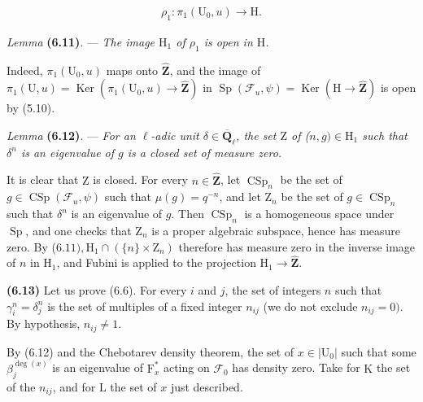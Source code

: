 \documentclass[10pt,leqno]{article}
\begin{document}
\begin{equation*}\begin{gathered}\rho _{1} : \pi _{1}(\mathrm{U}_{0},u) \longrightarrow  \mathrm{H}.\end{gathered}\end{equation*}

\noindent \emph{Lemma} \textbf{(6.11)}. — {\itshape The image \(\mathrm{H}_{1}\) of \(\rho _{1}\) is open in \(\mathrm{H}\).}\par

\noindent Indeed, \(\pi _{1}(\mathrm{U}_{0},u)\) maps onto \(\widehat{\mathbf{Z}}\), and the image of \(\pi _{1}(\mathrm{U},u)=\operatorname{Ker}(\pi _{1}(\mathrm{U}_{0},u)\longrightarrow \widehat{\mathbf{Z}})\) in \(\operatorname{Sp}(\mathcal{F} _{u},\psi )=\operatorname{Ker}(\mathrm{H}\longrightarrow \widehat{\mathbf{Z}})\) is open by (5.10).\par

\noindent \emph{Lemma} \textbf{(6.12)}. — {\itshape For an \(\ell \)-adic unit \(\delta \in \overline{\mathbf{Q}}_{\ell }\), the set \(\mathrm{Z}\) of (\(n,g)\in \mathrm{H}_{1}\) such that \(\delta ^{n}\) is an eigenvalue of \(g\) is a closed set of measure zero.}\par

\noindent It is clear that \(\mathrm{Z}\) is closed. For every \(n\in \widehat{\mathbf{Z}}\), let \(\operatorname{CSp}_{n}\) be the set of \(g\in \operatorname{CSp}(\mathcal{F} _{u},\psi )\) such that \(\mu (g)=q^{- n}\), and let \(\mathrm{Z}_{n}\) be the set of \(g\in \operatorname{CSp}_{n}\) such that \(\delta ^{n}\) is an eigenvalue of \(g\). Then \(\operatorname{CSp}_{n}\) is a homogeneous space under \(\operatorname{Sp}\), and one checks that \(\mathrm{Z}_{n}\) is a proper algebraic subspace, hence has measure zero. By (\(6.11), \mathrm{H}_{1}\cap (\{n\}\times \mathrm{Z}_{n})\) therefore has measure zero in the inverse image of \(n\) in \(\mathrm{H}_{1}\), and Fubini is applied to the projection \(\mathrm{H}_{1}\longrightarrow \widehat{\mathbf{Z}}\).\par

\noindent \textbf{(6.13)} Let us prove (6.6). For every \(i\) and \(j\), the set of integers \(n\) such that \(\gamma _{i}^{n}=\delta _{j}^{n}\) is the set of multiples of a fixed integer \(n_{ij}\) (we do not exclude \(n_{ij}=0)\). By hypothesis, \(n_{ij}\ne 1\).\par

\noindent By (6.12) and the Chebotarev density theorem, the set of \(x\in |\mathrm{U}_{0}|\) such that some \(\beta _{j}^{\operatorname{deg}(x)}\) is an eigenvalue of \(\mathrm{F}_{x}^{*}\) acting on \(\mathcal{F} _{0}\) has density zero. Take for \(\mathrm{K}\) the set of the \(n_{ij}\), and for \(\mathrm{L}\) the set of \(x\) just described.\par
\end{document}
